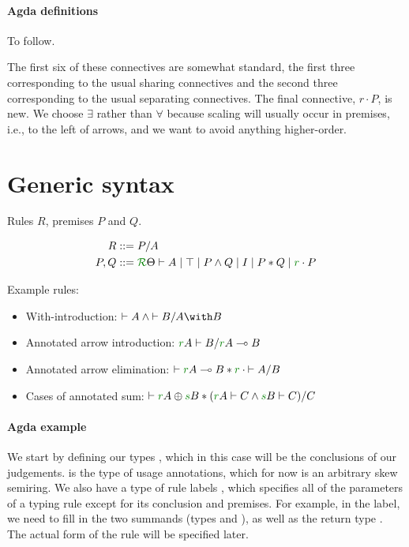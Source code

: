 \paragraph{Agda definitions}
To follow.

The first six of these connectives are somewhat standard, the first three
corresponding to the usual sharing connectives and the second three
corresponding to the usual separating connectives.
The final connective, $r \cdot P$, is new.
We choose $\exists$ rather than $\forall$ because scaling will usually occur in
premises, i.e., to the left of arrows, and we want to avoid anything
higher-order.

\section{Generic syntax}

Rules $R$, premises $P$ and $Q$.

\begin{align*}
  R &::= P/A \\
  P,Q &::= \grR\Theta \vdash A \mid \top \mid P \wedge Q \mid I \mid P * Q
        \mid \gr r \cdot P
\end{align*}

Example rules:

\begin{itemize}
  \item With-introduction: ${\vdash A} \wedge {\vdash B} / A \with B$
  \item Annotated arrow introduction:
    ${\gr rA \vdash B} / \gr rA \multimap B$
  \item Annotated arrow elimination:
    ${\vdash \gr rA \multimap B} * \gr r \cdot {\vdash A} / B$
  \item Cases of annotated sum:
    ${\vdash \gr rA \oplus \gr sB}
    * ({\gr rA \vdash C} \wedge {\gr sB \vdash C}) / C$
\end{itemize}

\paragraph{Agda example}

We start by defining our types , which in this case will be the
conclusions of our judgements.
 is the type of usage annotations, which for now is an
arbitrary skew semiring.
We also have a type of rule labels , which specifies all of
the parameters of a typing rule except for its conclusion and premises.
For example, in the  label, we need to fill in
the two summands (types  and ), as well as the return
type .
The actual form of the rule will be specified later.

